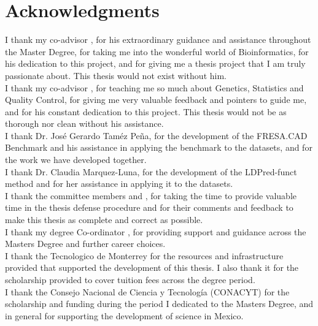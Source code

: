 \section*{Acknowledgments}

I thank my co-advisor \firstAdvisorName, for his extraordinary guidance and assistance throughout the Master Degree, for taking me into the wonderful world of Bioinformatics, for his dedication to this project, and for giving me a thesis project that I am truly passionate about. This thesis would not exist without him.\\

I thank my co-advisor \secondAdvisorName, for teaching me so much about Genetics, Statistics and Quality Control, for giving me very valuable feedback and pointers to guide me, and for his constant dedication to this project. This thesis would not be as thorough nor clean without his assistance.\\

I thank Dr. José Gerardo Taméz Peña, for the development of the FRESA.CAD Benchmark and his assistance in applying the benchmark to the datasets, and for the work we have developed together.\\

I thank Dr. Claudia Marquez-Luna, for the development of the LDPred-funct method and for her assistance in applying it to the datasets.\\

I thank the committee members \thirdAdvisorName  and \fourthAdvisorName, for taking the time to provide valuable time in the thesis defense procedure and for their comments and feedback to make this thesis as complete and correct as possible.\\

I thank my degree Co-ordinator \programDirectorName, for providing support and guidance across the Masters Degree and further career choices.\\

I thank the Tecnologico de Monterrey for the resources and infrastructure provided that supported the development of this thesis. I also thank it for the scholarship provided to cover tuition fees across the degree period.\\

I thank the Consejo Nacional de Ciencia y Tecnología (CONACYT) for the scholarship and funding during the period I dedicated to the Masters Degree, and in general for supporting the development of science in Mexico.\\

